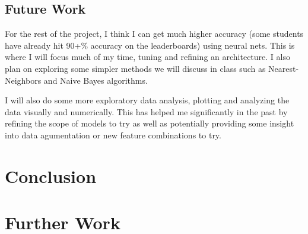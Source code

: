 \documentclass[conference]{IEEEtran}
\begin{document}
    \subsection{Future Work}
        For the rest of the project, I think I can get much higher accuracy (some students have already hit 90+\% accuracy on the leaderboards) using neural nets. This is where I will focus much of my time, tuning and refining an architecture. I also plan on exploring some simpler methods we will discuss in class such as Nearest-Neighbors and Naive Bayes algorithms.

        I will also do some more exploratory data analysis, plotting and analyzing the data visually and numerically. This has helped me significantly in the past by refining the scope of models to try as well as potentially providing some insight into data agumentation or new feature combinations to try.

\section{Conclusion}

\section{Further Work}
\end{document}
